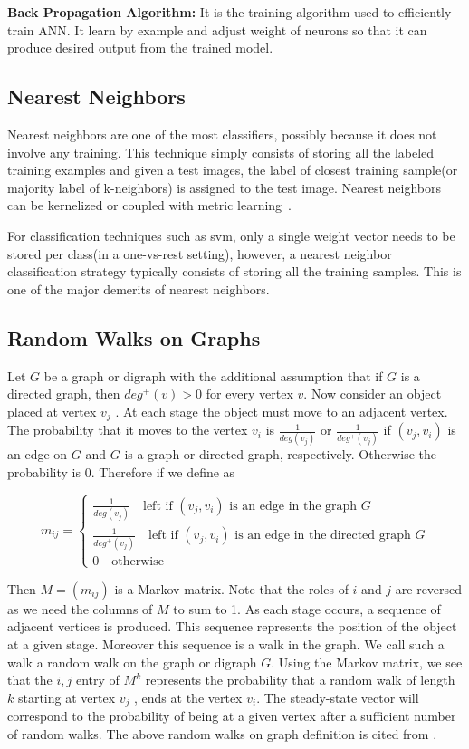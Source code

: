 \textbf{Back Propagation Algorithm:} It is the training algorithm used to efficiently train ANN. It learn by example and adjust weight of neurons so that it can produce desired output from the trained model.

\subsection{Nearest Neighbors}
\label{subsec:Nearest Neighbors}
Nearest neighbors are one of the most classifiers, possibly because it does not involve any training. This technique simply consists of storing all the labeled training examples and given a test images, the label of closest training sample(or majority label of k-neighbors) is assigned to the test image. Nearest neighbors can be kernelized or coupled with metric learning~\cite{lmnn}.


For classification techniques such as {\sc svm}, only a single weight vector needs to be stored per class(in a one-vs-rest setting), however, a nearest neighbor classification strategy typically consists of storing all the training samples. This is one of the major demerits of nearest neighbors. 


\subsection{Random Walks on Graphs}
Let $G$ be a graph or digraph with the additional assumption that if $G$ is a directed graph, then $deg^+(v) > 0$ for every vertex $v$. Now consider an object placed at vertex $v_j$ . At each stage the object must move to an adjacent vertex. The probability that it moves to the vertex $v_i$ is $ \frac{1}{deg(v_j)}$ or 
$ \frac{1}{deg^+(v_j)}$ if $(v_j , v_i)$ is an edge on $G$ and $G$ is a graph or directed graph, respectively. Otherwise the probability is $0$. Therefore if we define as

\[
  m_{ij}=\begin{cases}
               \frac{1}{deg(v_j)} \quad \text{left if $(v_j , v_i)$ is an edge in the graph $G$}  \\ 
               \frac{1}{deg^+(v_j)} \quad \text{left if $(v_j , v_i)$ is an edge in the directed graph $G$}  \\ 
               0 \quad \text{otherwise}
            \end{cases}
\]

Then $M = (m_{ij})$ is a Markov matrix. Note that the roles of $i$ and $j$ are reversed as we need the columns of $M$ to sum to 1. As each stage occurs, a sequence of adjacent vertices is produced. This sequence represents the position of the object at a given stage. Moreover this sequence is a walk in the graph. We call such a walk a random walk on the graph or digraph $G$. Using the Markov matrix, we see that the $i, j$ entry of $M^k$
represents the probability that a random walk of length $k$ starting at vertex $v_j$ , ends at the vertex $v_i$. The steady-state vector will correspond to the probability of being at a given vertex after a sufficient number of random walks. The above random walks on graph definition is cited from \cite{random_walks}.


